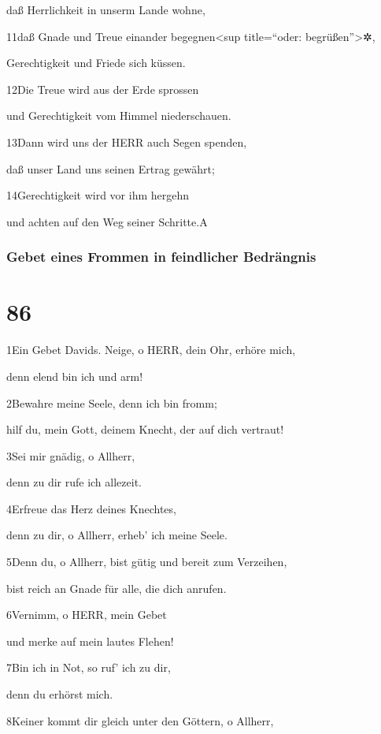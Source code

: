 daß Herrlichkeit in unserm Lande wohne,

11daß Gnade und Treue einander begegnen\textless sup title=``oder:
begrüßen''\textgreater✲,

Gerechtigkeit und Friede sich küssen.

12Die Treue wird aus der Erde sprossen

und Gerechtigkeit vom Himmel niederschauen.

13Dann wird uns der HERR auch Segen spenden,

daß unser Land uns seinen Ertrag gewährt;

14Gerechtigkeit wird vor ihm hergehn

und achten auf den Weg seiner Schritte.{A}

\hypertarget{gebet-eines-frommen-in-feindlicher-bedruxe4ngnis}{%
\subsubsection{Gebet eines Frommen in feindlicher
Bedrängnis}\label{gebet-eines-frommen-in-feindlicher-bedruxe4ngnis}}

\hypertarget{section-85}{%
\section{86}\label{section-85}}

1Ein Gebet Davids. Neige, o HERR, dein Ohr, erhöre mich,

denn elend bin ich und arm!

2Bewahre meine Seele, denn ich bin fromm;

hilf du, mein Gott, deinem Knecht, der auf dich vertraut!

3Sei mir gnädig, o Allherr,

denn zu dir rufe ich allezeit.

4Erfreue das Herz deines Knechtes,

denn zu dir, o Allherr, erheb' ich meine Seele.

5Denn du, o Allherr, bist gütig und bereit zum Verzeihen,

bist reich an Gnade für alle, die dich anrufen.

6Vernimm, o HERR, mein Gebet

und merke auf mein lautes Flehen!

7Bin ich in Not, so ruf' ich zu dir,

denn du erhörst mich.

8Keiner kommt dir gleich unter den Göttern, o Allherr,

